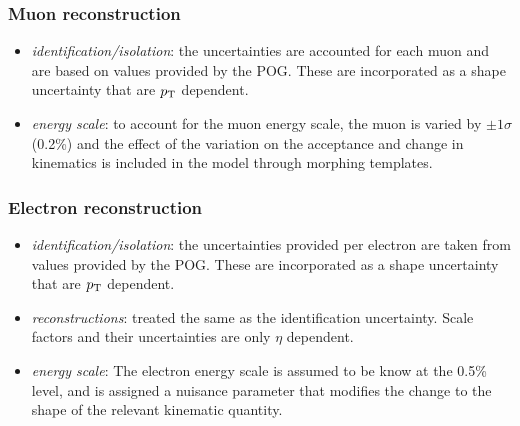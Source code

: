 \subsubsection{Muon reconstruction}
    \begin{itemize}
    \item \textit{identification/isolation}: the uncertainties are
        accounted for each muon and are based on values provided
        by the POG.  These are incorporated as a shape uncertainty that
        are $p_{\mathrm{T}}$ dependent.  
    \item \textit{energy scale}: to account for the muon energy scale,
        the muon \pt is varied by $\pm 1 \sigma$ (0.2\%) and the effect of
        the variation on the acceptance and change in kinematics is included
        in the model through morphing templates.
    \end{itemize}

\subsubsection{Electron reconstruction}
    \begin{itemize}
        \item \textit{identification/isolation}: the uncertainties
            provided per electron are taken from values provided by the
            POG.  These are incorporated as a shape uncertainty that are
            $p_{\mathrm{T}}$ dependent.
        \item \textit{reconstructions}: treated the same as the
            identification uncertainty.  Scale factors and their
            uncertainties are only $\eta$ dependent. 
        \item \textit{energy scale}: The electron energy scale is
            assumed to be know at the 0.5\% level, and is assigned a
            nuisance parameter that modifies the change to the shape of
            the relevant kinematic quantity.
    \end{itemize}

